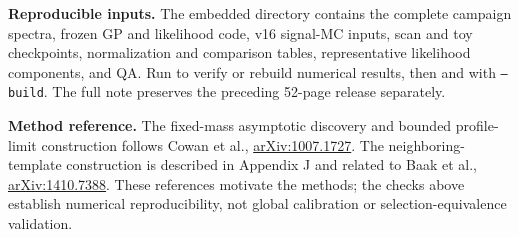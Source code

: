 \documentclass[11pt]{article}
\begin{document}
\textbf{Reproducible inputs.} The embedded  directory contains the complete campaign spectra, frozen GP and likelihood code, v16 signal-MC inputs, scan and toy checkpoints, normalization and comparison tables, representative likelihood components, and QA. Run  to verify or rebuild numerical results, then  and  with \texttt{--build}. The full note preserves the preceding 52-page release separately.

\textbf{Method reference.} The fixed-mass asymptotic discovery and bounded profile-limit construction follows Cowan et al., \href{https://arxiv.org/abs/1007.1727}{arXiv:1007.1727}. The neighboring-template construction is described in Appendix J and related to Baak et al., \href{https://arxiv.org/abs/1410.7388}{arXiv:1410.7388}. These references motivate the methods; the checks above establish numerical reproducibility, not global calibration or selection-equivalence validation.
\end{document}
